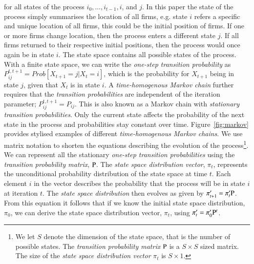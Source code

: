 \documentclass[preprint, 12pt]{elsarticle}
\begin{document}
for all states of the process $i_0, \dots, i_{t-1}, i$, and $j$. In this paper the state of the process simply summarises the location of all firms, e.g. state $i$ refers a specific and unique location of all firms, this could be the initial position of firms. If one or more firms change location, then the process enters a different state $j$. If all firms returned to their respective initial positions, then the process would once again be in state $i$. The state space contains all possible states of the process. With a finite state space, we can write the \emph{one-step transition probability} as $P_{ij}^{t,t+1} = Prob\left[ {X_{t+1} = j} \left| {X_t = i} \right. \right]$, which is the probability for $X_{t+1}$ being in state $j$, given that $X_t$ is in state $i$. A \emph{time-homogenous Markov chain} further requires that the \emph{transition probabilities} are independent of the iteration parameter; $P_{ij}^{t,t+1} = P_{ij}$. This is also known as a Markov chain with \emph{stationary transition probabilities}. Only the current state affects the probability of the next state in the process and probabilities stay constant over time. Figure~\ref{fig:markov} provides stylised examples of different \emph{time-homogenous Markov chains}. We use matrix notation to shorten the equations describing the evolution of the process\footnote{We let $S$ denote the dimension of the state space, that is the number of possible states. The \emph{transition probability matrix} $\rm P$ is a $S \times S$ sized matrix. The size of the \emph{state space distribution vector} $\pi_t$ is $S \times 1$.}. We can represent all the stationary \emph{one-step transition probabilities} using the \emph{transition probability matrix}, $\rm P$. The \emph{state space distribution vector}, $\pi_t$, represents the unconditional probability distribution of the state space at time $t$. Each element $i$ in the vector describes the probability that the process will be in state $i$ at iteration $t$. The \emph{state space distribution} then evolves as given by $\pi'_{t+1} = \pi'_t \rm P$. From this equation it follows that if we know the initial state space distribution, $\pi_0$, we can derive the state space distribution vector, $\pi_t$, using $\pi'_t = \pi'_0 {\rm P}^t$.
\end{document}
